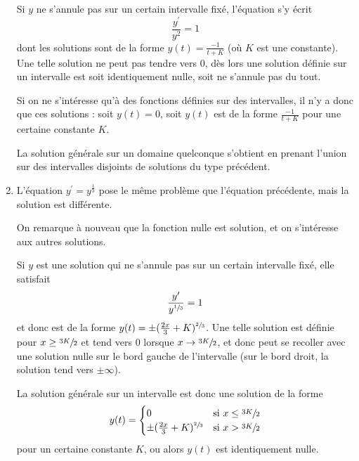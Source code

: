 \begin{enumerate}
Si $y$ ne s'annule pas sur un certain intervalle fixé, l'équation
s'y écrit
\begin{equation*}
\frac{y^\prime}{y^2} = 1
\end{equation*}
dont les solutions sont de la forme $y(t) = \frac{-1}{t + K}$ (où
$K$ est une constante). Une telle solution ne peut pas tendre vers
$0$, dès lors une solution définie sur un intervalle est soit
identiquement nulle, soit ne s'annule pas du tout.

Si on ne s'intéresse qu'à des fonctions définies sur des
intervalles, il n'y a donc que ces solutions : soit $y(t) = 0$, soit
$y(t)$ est de la forme $\frac{-1}{t + K}$ pour une certaine
constante $K$.

La solution générale sur un domaine quelconque s'obtient en prenant
l'union sur des intervalles disjoints de solutions du type
précédent.

\item L'équation $y^\prime = y^{\frac13}$ pose le même problème que
l'équation précédente, mais la solution est différente.

On remarque à nouveau que la fonction nulle est solution, et on
s'intéresse aux autres solutions.

Si $y$ est une solution qui ne s'annule pas sur un certain
intervalle fixé, elle satisfait
\begin{equation*}
\frac{y^\prime}{y^{\sfrac13}} = 1
\end{equation*}
et donc est de la forme $y(t) = \pm (\frac{2x}{3} +
K)^{\sfrac23}$. Une telle solution est définie pour $x \geq
\sfrac{3K}2$ et tend vers $0$ lorsque $x \to \sfrac{3K}2$, et donc
peut se recoller avec une solution nulle \og sur le bord gauche de
l'intervalle\fg{} (sur le bord droit, la solution tend vers $\pm
\infty$).

La solution générale sur un intervalle est donc une solution de la
forme
\begin{equation*}
y(t) =
\begin{cases}
0& \text{si $x \leq \sfrac{3K}2$}\\
\pm (\frac{2x}{3} + K)^{\sfrac23}& \text{si $x >
\sfrac{3K}2$}\end{cases}
\end{equation*}
pour un certaine constante $K$, ou alors $y(t)$ est identiquement
nulle.


\end{enumerate}
